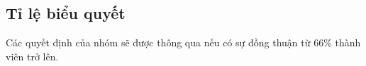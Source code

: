 \subsection{Tỉ lệ biểu quyết}
Các quyết định của nhóm sẽ được thông qua nếu có sự đồng thuận từ 66\% thành viên trở lên.
